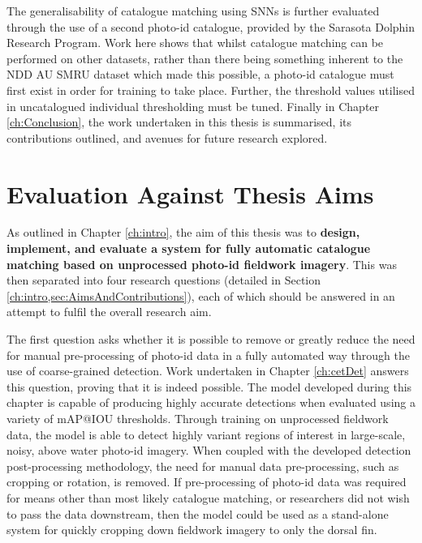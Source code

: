 The generalisability of catalogue matching using SNNs is further evaluated through the use of a second photo-id catalogue, provided by the Sarasota Dolphin Research Program. Work here shows that whilst catalogue matching can be performed on other datasets, rather than there being something inherent to the NDD AU SMRU dataset which made this possible, a photo-id catalogue must first exist in order for training to take place. Further, the threshold values utilised in uncatalogued individual thresholding must be tuned. Finally in Chapter \ref{ch:Conclusion}, the work undertaken in this thesis is summarised, its contributions outlined, and avenues for future research explored. 

\section{Evaluation Against Thesis Aims}\label{ch:Conclusion,sec:AimsEvaluation}

As outlined in Chapter \ref{ch:intro}, the aim of this thesis was to \textbf{design, implement, and evaluate a system for fully automatic catalogue matching based on unprocessed photo-id fieldwork imagery}. This was then separated into four research questions (detailed in Section \ref{ch:intro,sec:AimsAndContributions}), each of which should be answered in an attempt to fulfil the overall research aim. 

The first question asks whether it is possible to remove or greatly reduce the need for manual pre-processing of photo-id data in a fully automated way through the use of coarse-grained detection. Work undertaken in Chapter \ref{ch:cetDet} answers this question, proving that it is indeed possible. The model developed during this chapter is capable of producing highly accurate detections when evaluated using a variety of mAP@IOU thresholds. Through training on unprocessed fieldwork data, the model is able to detect highly variant regions of interest in large-scale, noisy, above water photo-id imagery. When coupled with the developed detection post-processing methodology, the need for manual data pre-processing, such as cropping or rotation, is removed. If pre-processing of photo-id data was required for means other than most likely catalogue matching, or researchers did not wish to pass the data downstream, then the model could be used as a stand-alone system for quickly cropping down fieldwork imagery to only the dorsal fin. 

